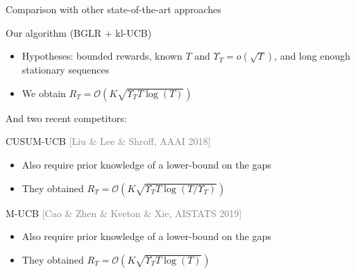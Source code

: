 \documentclass[11pt,english,ignorenonframetext,]{beamer}
\begin{document}
\begin{frame}{Comparison with other state-of-the-art approaches}

  \begin{exampleblock}{Our algorithm (BGLR + kl-UCB)}
    \begin{itemize}
      \item Hypotheses: bounded rewards, known $T$ and $\Upsilon_T = o(\sqrt{T})$, and long enough stationary sequences
      \item We obtain $R_T = \mathcal{O}(K \sqrt{\Upsilon_T T \log(T)})$
    \end{itemize}
  \end{exampleblock}

  And two recent competitors:


  \begin{block}{CUSUM-UCB \hfill{} \textcolor{gray}{[Liu \& Lee \& Shroff, AAAI 2018]}}
    \begin{itemize}
      \item Also require \alert{prior knowledge of a lower-bound on the gaps}
      \item They obtained $R_T = \mathcal{O}(K \sqrt{\Upsilon_T T \log(T / \Upsilon_T)})$
    \end{itemize}
  \end{block}

  \begin{block}{M-UCB \hfill{} \textcolor{gray}{[Cao \& Zhen \& Kveton \& Xie, AISTATS 2019]}}
    \begin{itemize}
      \item Also require \alert{prior knowledge of a lower-bound on the gaps}
      \item They obtained $R_T = \mathcal{O}(K \sqrt{\Upsilon_T T \log(T)})$
    \end{itemize}
  \end{block}

\end{frame}
\end{document}
